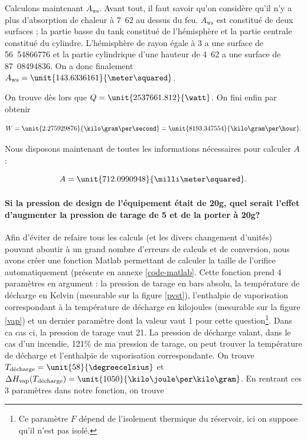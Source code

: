 Calculons maintenant $A_{\text{ws}}$. Avant tout, il faut
savoir qu'on considère qu'il n'y a plus d'absorption de chaleur
à \unit{7.62}{\meter} au dessus du feu\cite{mignon}.
$A_{\text{ws}}$ est constitué de deux surfaces ; la partie
basse du tank constitué de l'hémisphère et la partie centrale
constitué du cylindre. L'hémisphère de rayon égale à \unit{3}{\meter}
a une surface de \unit{56.54866776}{\meter\squared} et la partie
cylindrique d'une hauteur de \unit{4.62}{\meter} a une surface
de \unit{87.08494836}{\meter\squared}. On a donc finalement 
$A_{\text{ws}} = \unit{143.6336161}{\meter\squared}$.

On trouve dès lors que $Q = \unit{2537661.812}{\watt}$.
On fini enfin par obtenir 

$$W = \unit{2.275929876}{\kilo\gram\per\second} =
\unit{8193.347554}{\kilo\gram\per\hour}.$$

Nous disposons maintenant de toutes les informations nécessaires
pour calculer $A$ :

$$A = \unit{712.0990948}{\milli\meter\squared}.$$

\paragraph{Si la pression de design de l'équipement était de \unit{20}{\bbar g},
quel serait l'effet d'augmenter la pression de tarage de \unit{5}{\bbar} et de 
la porter à \unit{20}{\bbar g}?}
Afin d'éviter de refaire tous les calculs (et les divers changement d'unités)
pouvant aboutir à un grand nombre d'erreurs de calculs et de conversion, nous
avons créer une fonction Matlab permettant de calculer la taille de l'orifice
automatiquement (présente en annexe \ref{code-matlab}. Cette fonction prend 4 paramètres en argument : la pression
de tarage en bars absolu, la température de décharge en Kelvin (mesurable sur
la figure \ref{pvst}), l'enthalpie de vaporisation correspondant
à la température de décharge en kilojoules (mesurable sur la figure \ref{vap}) et un dernier
paramètre dont la valeur vaut 1 pour cette question\footnote{Ce paramètre $F$ dépend
de l'isolement thermique du réservoir, ici on suppose qu'il n'est pas isolé.}.
Dans ca cas ci, la pression de tarage vaut \unit{21}{\bbar}. La pression
de décharge valant, dans le cas d'un incendie, 121\% de ma pression de tarage,
on peut trouver la température de décharge et l'enthalpie de vaporisation
correspondante. On trouve $T_{\text{décharge}} = \unit{58}{\degreecelsius}$
et $\Delta H_{\text{vap}}(T_{\text{décharge}}) = \unit{1050}{\kilo\joule\per\kilo\gram}$.
En rentrant ces 3 paramètres dans notre fonction, on trouve 

